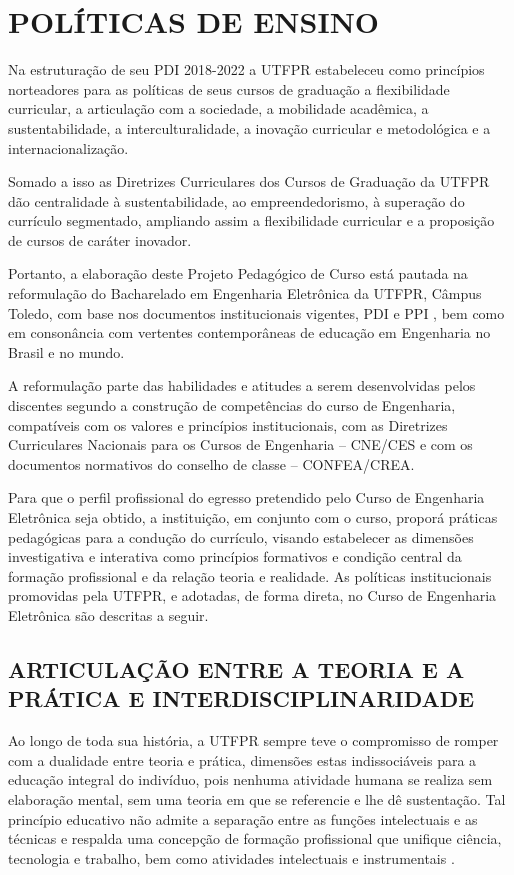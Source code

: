 \chapter{POLÍTICAS DE ENSINO}
\label{chap:politicas}

Na estruturação de seu PDI 2018-2022 \cite{pdiutfpr} a UTFPR estabeleceu como princípios norteadores para as políticas de seus cursos de graduação a flexibilidade curricular, a articulação com a sociedade, a mobilidade acadêmica, a sustentabilidade, a interculturalidade, a inovação curricular e metodológica e a internacionalização.

Somado a isso as Diretrizes Curriculares dos Cursos de Graduação da UTFPR \cite{cogep90} dão centralidade à sustentabilidade, ao empreendedorismo, à superação do currículo segmentado, ampliando assim a flexibilidade curricular e a proposição de cursos de caráter inovador.

Portanto, a elaboração deste Projeto Pedagógico de Curso está pautada na reformulação do Bacharelado em Engenharia Eletrônica da UTFPR, Câmpus Toledo, com base nos documentos institucionais vigentes, PDI \cite{pdiutfpr} e PPI \cite{ppiutfpr}, bem como em consonância com vertentes contemporâneas de educação em Engenharia no Brasil e no mundo.

A reformulação parte das habilidades e atitudes a serem desenvolvidas pelos discentes segundo a construção de competências do curso de Engenharia, compatíveis com os valores e princípios institucionais, com as Diretrizes Curriculares Nacionais para os Cursos de Engenharia – CNE/CES e com os documentos normativos do conselho de classe – CONFEA/CREA.

Para que o perfil profissional do egresso pretendido pelo Curso de Engenharia Eletrônica seja obtido, a instituição, em conjunto com o curso, proporá práticas pedagógicas para a condução do currículo, visando estabelecer as dimensões investigativa e interativa como princípios formativos e condição central da formação profissional e da relação teoria e realidade. As políticas institucionais promovidas pela UTFPR, e adotadas, de forma direta, no Curso de Engenharia Eletrônica são descritas a seguir.

\section{ARTICULAÇÃO ENTRE A TEORIA E A PRÁTICA E INTERDISCIPLINARIDADE}
\label{sec:artc}

Ao longo de toda sua história, a UTFPR sempre teve o compromisso de romper com a dualidade entre teoria e prática, dimensões estas indissociáveis para a educação integral do indivíduo, pois nenhuma atividade humana se realiza sem elaboração mental, sem uma teoria em que se referencie e lhe dê sustentação. Tal princípio educativo não admite a separação entre as funções intelectuais e as técnicas e respalda uma concepção de formação profissional que unifique ciência, tecnologia e trabalho, bem como atividades intelectuais e instrumentais \cite{pdiutfpr}.

